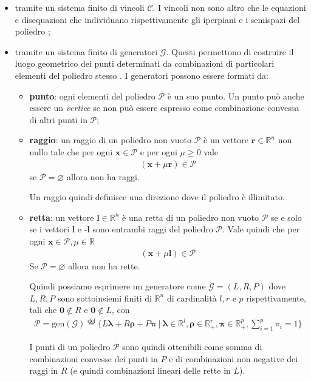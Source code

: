 \documentclass[italian]{mimosis}
\theoremstyle{definition}
\let\emptyset\varnothing
\begin{document}
\begin{itemize}
\item tramite un sistema finito di vincoli \(\mathcal{C}\). I vincoli
non sono altro che le equazioni e disequazioni che individuano rispettivamente
gli iperpiani e i semispazi del poliedro \cite{Becchi17th};
\item tramite un sistema finito di generatori \(\mathcal{G}\). Questi
permettono di costruire il luogo geometrico dei punti determinati da
combinazioni di particolari elementi del poliedro stesso \cite{Becchi17th}. I
generatori possono essere formati da:
\begin{itemize}
\item \textbf{punto}: ogni elementi del poliedro \(\mathcal{P}\) è un suo punto. Un punto
può anche essere un \emph{vertice} se non può essere espresso come combinazione
convessa di altri punti in \(\mathcal{P}\);
\item \textbf{raggio}: un raggio di un poliedro non vuoto \(\mathcal{P}\) è un vettore
\(\bm{r} \in \mathbb{R}^n\) non nullo tale che per ogni \(\bm{x} \in
    \mathcal{P}\) e per ogni \(\mu \ge 0\) vale
\begin{align*}
(\bm{x} + \mu \bm{r}) \in \mathcal{P}
\end{align*}
se \(\mathcal{P} = \emptyset\) allora non ha raggi.

Un raggio quindi definisce una direzione dove il poliedro è illimitato.
\item \textbf{retta}: un vettore \(\bm{l} \in \mathbb{R}^n\) è una retta di un poliedro non
vuoto \(\mathcal{P}\) se e solo se i vettori \(\bm{l}\) e -\(\bm{l}\) sono
entrambi raggi del poliedro \(\mathcal{P}\). Vale quindi che per ogni \(\bm{x}
    \in \mathcal{P}, \mu \in \mathbb{R}\)
\begin{align*}
(\bm{x} + \mu\bm{l}) \in \mathcal{P}
\end{align*}
Se \(\mathcal{P} = \emptyset\) allora non ha rette.

Quindi possiamo esprimere un generatore come \(\mathcal{G} =
    (\mathit{L},\mathit{R},\mathit{P})\) dove \(\mathit{L},\mathit{R},\mathit{P}\)
sono sottoinsiemi finiti di \(\mathbb{R}^n\) di cardinalità \(l,r\) e \(p\)
rispettivamente, tali che \(\bm{0} \notin \mathit{R}\) e \(\bm{0} \notin \mathit{L}\), con
\begin{align*}
\mathcal{P} = \text{gen}(\mathcal{G}) \stackrel{\text{def}}{=} \{\mathit{L}\bm{\lambda} + \mathit{R}\bm{\rho} + \mathit{P}\bm{\pi} \: | \:
\bm{\lambda} \in \mathbb{R}^l, \bm{\rho} \in \mathbb{R}^r_+, \bm{\pi} \in \mathbb{R}^p_+, \sum\limits_{i=1}^p \pi_i = 1\}
\end{align*}

I punti di un poliedro \(\mathcal{P}\) sono quindi ottenibili come somma di combinazioni
convesse dei punti in \(\mathit{P}\) e di combinazioni non negative
dei raggi in \(\mathit{R}\) (e quindi combinazioni lineari delle rette in \(\mathit{L}\)).
\end{itemize}
\end{itemize}
\end{document}
